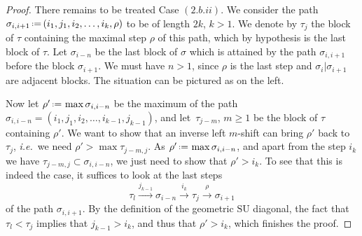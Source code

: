 \documentclass{amsart}
\theoremstyle{definition}
\newcommand{\ssm}{\smallsetminus} %
\newcommand{\eqdef}{\mbox{\,\raisebox{0.2ex}{\scriptsize\ensuremath{\mathrm:}}\ensuremath{=}\,}} %
\newcommand{\ie}{\textit{i.e.}~} %
\newcommand{\SU}{\mathrm{SU}}
\begin{document}
\begin{proof}
There remains to be treated Case $(2.b.ii)$.
We consider the path $\sigma_{i,i+1} \eqdef (i_1,j_1,i_2,\dots,i_{k},\rho)$ to be of length $2k$, $k>1$. 
We denote by $\tau_j$ the block of $\tau$ containing the maximal step $\rho$ of this path, which by hypothesis is the last block of $\tau$. 
Let $\sigma_{i-n}$ be the last block of $\sigma$ which is attained by the path $\sigma_{i,i+1}$ before the block $\sigma_{i+1}$. 
We must have $n>1$, since $\rho$ is the last step and $\sigma_i|\sigma_{i+1}$ are adjacent blocks.
The situation can be pictured as on the left.
\begin{center}
\end{center}
Now let $\rho' \eqdef \max\sigma_{i,i-n}$ be the maximum of the path $\sigma_{i,i-n}=(i_1,j_1,i_2,\dots,i_{k-1},j_{k-1})$, and let~$\tau_{j-m}$, $m\geq 1$ be the block of $\tau$ containing $\rho'$.
We want to show that an inverse left $m$-shift can bring $\rho'$ back to $\tau_j$, \ie we need $\rho' > \max \tau_{j-m,j}$.
As $\rho'\eqdef \max \sigma_{i,i-n}$, and apart from the step $i_k$ we have $\tau_{j-m,j}\subset \sigma_{i,i-n}$, we just need to show that $\rho' > i_k$.
To see that this is indeed the case, it suffices to look at the last steps $$\tau_l \overset{j_{k-1}}{\longrightarrow} \sigma_{i-n} \overset{i_{k}}{\longrightarrow} \tau_j \overset{\rho}{\longrightarrow} \sigma_{i+1}$$ of the path $\sigma_{i,i+1}$. 
By the definition of the geometric $\SU$ diagonal, the fact that $\tau_l < \tau_j$ implies that $j_{k-1} > i_k$, and thus that $\rho' > i_k$, which finishes the proof. 
\end{proof}
\end{document}
